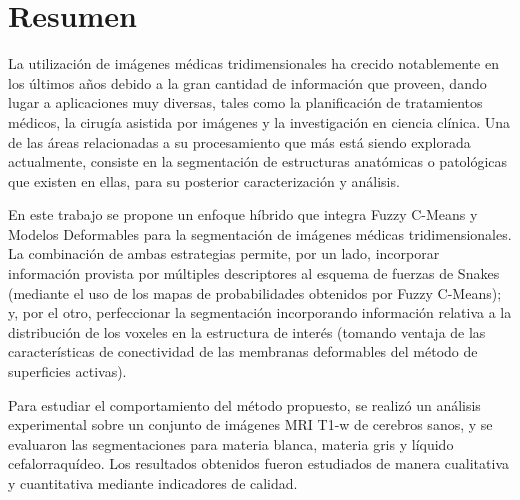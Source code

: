 \chapter*{Resumen}
La utilización de imágenes médicas tridimensionales ha crecido notablemente en los últimos años debido a la gran cantidad de información que proveen, dando lugar a aplicaciones muy diversas, tales como la planificación de tratamientos médicos, la cirugía asistida por imágenes y la investigación en ciencia clínica. Una de las áreas relacionadas a su procesamiento que más está siendo explorada actualmente, consiste en la segmentación de estructuras anatómicas o patológicas que existen en ellas, para su posterior caracterización y análisis.

En este trabajo se propone un enfoque híbrido que integra Fuzzy C-Means y Modelos Deformables para la segmentación de imágenes médicas tridimensionales. La combinación de ambas estrategias permite, por un lado, incorporar información provista por múltiples descriptores al esquema de fuerzas de Snakes (mediante el uso de los mapas de probabilidades obtenidos por Fuzzy C-Means); y, por el otro, perfeccionar la segmentación incorporando información relativa a la distribución de los voxeles en la estructura de interés (tomando ventaja de las características de conectividad de las membranas deformables del método de superficies activas).

Para estudiar el comportamiento del método propuesto, se realizó un análisis experimental sobre un conjunto de imágenes MRI T1-w de cerebros sanos, y se evaluaron las segmentaciones para materia blanca, materia gris y líquido cefalorraquídeo. Los resultados obtenidos fueron estudiados de manera cualitativa y cuantitativa mediante indicadores de calidad.


